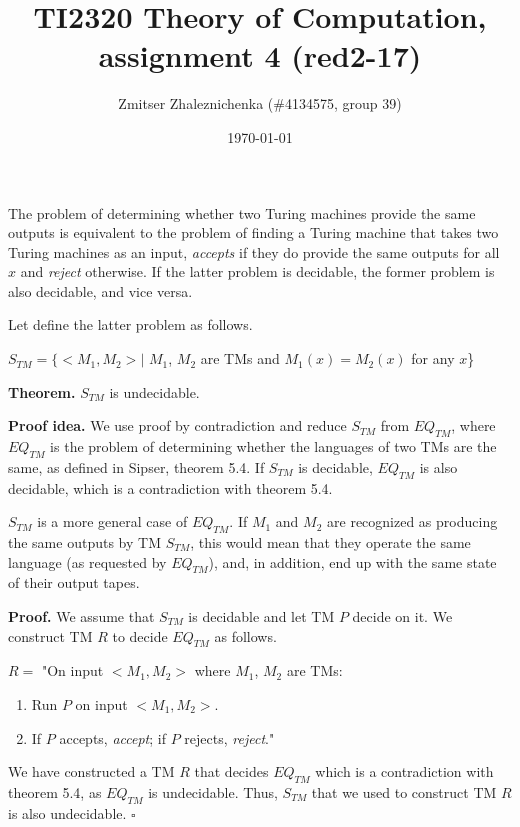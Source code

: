 \documentclass[a4paper, notitlepage]{article}
\begin{document}
\makeatletter
\renewcommand\paragraph{\@startsection{paragraph}{4}{\z@}%
  {-3.25ex\@plus -1ex \@minus -.2ex}%
  {1.5ex \@plus .2ex}%
  {\normalfont\normalsize\bfseries}}
\makeatother

\title{TI2320 Theory of Computation, assignment 4 (red2-17)} 
\author{Zmitser Zhaleznichenka (\#4134575, group 39)}
\date{\today}
\maketitle

\setcounter{secnumdepth}{0}

The problem of determining whether two Turing machines provide the same outputs is equivalent to the problem of finding a Turing machine that takes two Turing machines as an input, \emph{accepts} if they do provide the same outputs for all $x$ and \emph{reject} otherwise. If the latter problem is decidable, the former problem is also decidable, and vice versa.

Let define the latter problem as follows. 

\begin{center} 
$S_{TM} = \{<M_1, M_2> |$ $M_1$, $M_2$ are TMs and $M_1(x) = M_2(x)$ for any $x$\}
\end{center}

\textbf{Theorem.} $S_{TM}$ is undecidable.\newline

\textbf{Proof idea.} We use proof by contradiction and reduce $S_{TM}$ from $EQ_{TM}$, where $EQ_{TM}$ is the problem of determining whether the languages of two TMs are the same, as defined in Sipser, theorem 5.4. If $S_{TM}$ is decidable, $EQ_{TM}$ is also decidable, which is a contradiction with theorem 5.4. 

$S_{TM}$ is a more general case of $EQ_{TM}$. If $M_1$ and $M_2$ are recognized as producing the same outputs by TM $S_{TM}$, this would mean that they operate the same language (as requested by $EQ_{TM}$), and, in addition, end up with the same state of their output tapes. \newline

\textbf{Proof.} We assume that $S_{TM}$ is decidable and let TM $P$ decide on it. We construct TM $R$ to decide $EQ_{TM}$ as follows.\newline

$R = $ "On input $<M_1, M_2>$ where $M_1$, $M_2$ are TMs:
\begin{enumerate}
\item Run $P$ on input $<M_1, M_2>$.
\item If $P$ accepts, \emph{accept}; if $P$ rejects, \emph{reject}."
\end{enumerate}

We have constructed a TM $R$ that decides $EQ_{TM}$ which is a contradiction with theorem 5.4, as $EQ_{TM}$ is undecidable. Thus, $S_{TM}$ that we used to construct TM $R$ is also undecidable. $\square$
\end{document}
